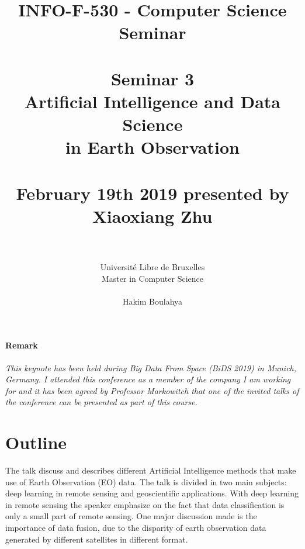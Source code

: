 \documentclass[11pt,a4paper]{article}
\begin{document}

\title{
\large INFO-F-530 - Computer Science Seminar \\~\\
\LARGE Seminar 3 \\ Artificial Intelligence and Data Science \\ in Earth Observation \\~\\
\Large February 19th 2019 presented by Xiaoxiang Zhu \\~\\}
\author{Université Libre de Bruxelles
\\ Master in Computer Science \\
\\ Hakim Boulahya}
\maketitle

\setcounter{section}{0}
\setcounter{page}{1}

\paragraph{Remark} \textit{This keynote has been held during Big Data From Space (BiDS 2019)  in Munich, Germany. I attended this conference as a member of the company I am working for and it has been agreed by Professor Markowitch that one of the invited talks of the conference can be presented as part of this course.}


\section{Outline}

The talk discuss and describes different Artificial Intelligence methods that make use of Earth Observation (EO) data. The talk is divided in two main subjects: deep learning in remote sensing and geoscientific applications.
With deep learning in remote sensing the speaker emphasize on the fact that data classification is only a small part of remote sensing. One major discussion made is the importance of data fusion, due to the disparity of earth observation data generated by different satellites in different format.

\paragraph{}
\end{document}
